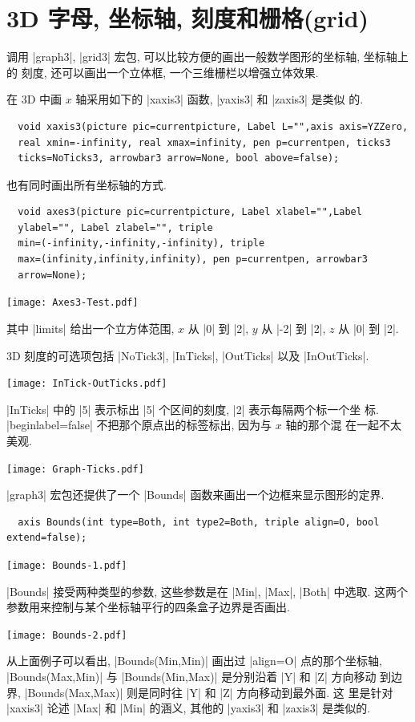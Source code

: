\documentclass[nofonts,CJKnormalspaces]{ctexbook}[2009/05/20]
\begin{document}
\section{3D 字母, 坐标轴, 刻度和栅格(grid)}
调用 |graph3|, |grid3| 宏包, 可以比较方便的画出一般数学图形的坐标轴, 坐标轴上的
刻度, 还可以画出一个立体框, 一个三维栅栏以增强立体效果.

在 3D 中画 $x$ 轴采用如下的 |xaxis3| 函数, |yaxis3| 和 |zaxis3| 是类似
的.
\begin{lstlisting}
  void xaxis3(picture pic=currentpicture, Label L="",axis axis=YZZero,
  real xmin=-infinity, real xmax=infinity, pen p=currentpen, ticks3
  ticks=NoTicks3, arrowbar3 arrow=None, bool above=false);
\end{lstlisting}
也有同时画出所有坐标轴的方式.
\begin{lstlisting}
  void axes3(picture pic=currentpicture, Label xlabel="",Label
  ylabel="", Label zlabel="", triple
  min=(-infinity,-infinity,-infinity), triple
  max=(infinity,infinity,infinity), pen p=currentpen, arrowbar3
  arrow=None);
\end{lstlisting}
\begin{center}\texttt{[image: Axes3-Test.pdf]}\end{center}%

其中 |limits| 给出一个立方体范围, $x$ 从 |0| 到 |2|, $y$ 从 |-2| 到 |2|, $z$
从 |0| 到 |2|.

3D 刻度的可选项包括 |NoTick3|, |InTicks|, |OutTicks| 以及
|InOutTicks|.
\begin{center}\texttt{[image: InTick-OutTicks.pdf]}\end{center}%

|InTicks| 中的 |5| 表示标出 |5| 个区间的刻度, |2| 表示每隔两个标一个坐
标. |beginlabel=false| 不把那个原点出的标签标出, 因为与 $x$ 轴的那个混
在一起不太美观.
\begin{center}\texttt{[image: Graph-Ticks.pdf]}\end{center}%

|graph3| 宏包还提供了一个 |Bounds| 函数来画出一个边框来显示图形的定界.
\begin{lstlisting}
  axis Bounds(int type=Both, int type2=Both, triple align=O, bool extend=false);
\end{lstlisting}
\begin{center}\texttt{[image: Bounds-1.pdf]}\end{center}%

|Bounds| 接受两种类型的参数, 这些参数是在 |Min|, |Max|, |Both| 中选取.
这两个参数用来控制与某个坐标轴平行的四条盒子边界是否画出.
\begin{center}\texttt{[image: Bounds-2.pdf]}\end{center}%

从上面例子可以看出, |Bounds(Min,Min)| 画出过 |align=O| 点的那个坐标轴,
|Bounds(Max,Min)| 与 |Bounds(Min,Max)| 是分别沿着 |Y| 和 |Z| 方向移动
到边界,  |Bounds(Max,Max)| 则是同时往 |Y| 和 |Z| 方向移动到最外面. 这
里是针对 |xaxis3| 论述 |Max| 和 |Min| 的涵义, 其他的 |yaxis3| 和
|zaxis3| 是类似的.
\end{document}
